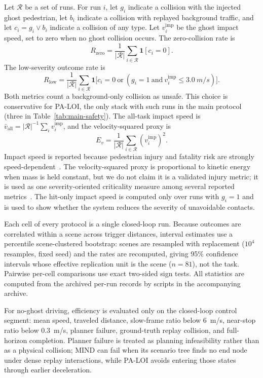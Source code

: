 \documentclass[journal]{IEEEtran}
\begin{document}
Let $\mathcal{R}$ be a set of runs. For run $i$, let $g_i$ indicate a collision with the injected ghost pedestrian, let $b_i$ indicate a collision with replayed background traffic, and let $c_i = g_i \vee b_i$ indicate a collision of any type. Let $v_i^{\mathrm{imp}}$ be the ghost impact speed, set to zero when no ghost collision occurs. The zero-collision rate is
\begin{equation}
  R_{\mathrm{zero}} =
  \frac{1}{|\mathcal{R}|}\sum_{i\in\mathcal{R}}\mathbf{1}[c_i=0].
\end{equation}
The low-severity outcome rate is
\begin{equation}
  R_{\mathrm{low}} =
  \frac{1}{|\mathcal{R}|}\sum_{i\in\mathcal{R}}
  \mathbf{1}\bigl[c_i=0 \ \mathrm{or}\ (g_i=1 \ \mathrm{and}\ v_i^{\mathrm{imp}}\le \SI{3.0}{m/s})\bigr].
\end{equation}
Both metrics count a background-only collision as unsafe. This choice is conservative for PA-LOI, the only stack with such runs in the main protocol (three in Table~\ref{tab:main-safety}).
The all-task impact speed is $\bar{v}_{\mathrm{all}}=|\mathcal{R}|^{-1}\sum_i v_i^{\mathrm{imp}}$, and the velocity-squared proxy is
\begin{equation}
  E_v =
  \frac{1}{|\mathcal{R}|}\sum_{i\in\mathcal{R}}(v_i^{\mathrm{imp}})^2.
\end{equation}
Impact speed is reported because pedestrian injury and fatality risk are strongly speed-dependent~\cite{rosen2009fatality}. The velocity-squared proxy is proportional to kinetic energy when mass is held constant, but we do not claim it is a validated injury metric; it is used as one severity-oriented criticality measure among several reported metrics~\cite{westhofen2023criticality}. The hit-only impact speed is computed only over runs with $g_i=1$ and is used to show whether the system reduces the severity of unavoidable contacts.

Each cell of every protocol is a single closed-loop run. Because outcomes are correlated within a scene across trigger distances, interval estimates use a percentile scene-clustered bootstrap: scenes are resampled with replacement ($10^{4}$ resamples, fixed seed) and the rates are recomputed, giving 95\% confidence intervals whose effective replication unit is the scene ($n=81$), not the task. Pairwise per-cell comparisons use exact two-sided sign tests. All statistics are computed from the archived per-run records by scripts in the accompanying archive.

For no-ghost driving, efficiency is evaluated only on the closed-loop control segment: mean speed, traveled distance, slow-frame ratio below \SI{6}{m/s}, near-stop ratio below \SI{0.3}{m/s}, planner failure, ground-truth replay collision, and full-horizon completion. Planner failure is treated as planning infeasibility rather than as a physical collision; MIND can fail when its scenario tree finds no end node under dense replay interactions, while PA-LOI avoids entering those states through earlier deceleration.
\end{document}
